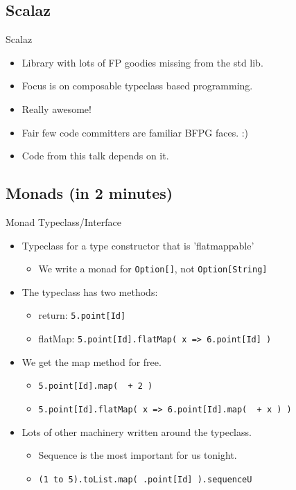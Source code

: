 \documentclass[professionalFonts,aspectratio=169]{beamer}
\begin{document}
\subsection{Scalaz}
\begin{frame}{Scalaz}
\begin{itemize}
  \pause \item Library with lots of FP goodies missing from the std lib.
  \pause \item Focus is on composable typeclass based programming.
  \pause \item Really awesome!
  \pause \item Fair few code committers are familiar BFPG faces. :)
  \pause \item Code from this talk depends on it.
\end{itemize}
\end{frame}

\subsection{Monads (in 2 minutes)}
\begin{frame}{Monad Typeclass/Interface}

\begin{itemize}
\pause \item Typeclass for a type constructor that is 'flatmappable'
  \begin{itemize}
    \item We write a monad for \texttt{Option[\textunderscore]}, not \texttt{Option[String]}
  \end{itemize}        
\pause \item The typeclass has two methods:
  \begin{itemize}
    \pause \item return: \texttt{5.point[Id]}
    \pause \item flatMap: \texttt{5.point[Id].flatMap( x => 6.point[Id] )}
  \end{itemize}
\pause \item We get the map method for free. 
  \begin{itemize}
    \pause \item \texttt{5.point[Id].map( \textunderscore \ + 2 )}
    \pause \item \texttt{5.point[Id].flatMap( x => 6.point[Id].map( \textunderscore \ + x ) )}
  \end{itemize}
\pause \item Lots of other machinery written around the typeclass.
   \begin{itemize}
     \pause \item Sequence is the most important for us tonight.
     \pause \item \texttt{(1 to 5).toList.map( \textunderscore.point[Id] ).sequenceU}
  \end{itemize}
\end{itemize}

\end{frame}
\end{document}
